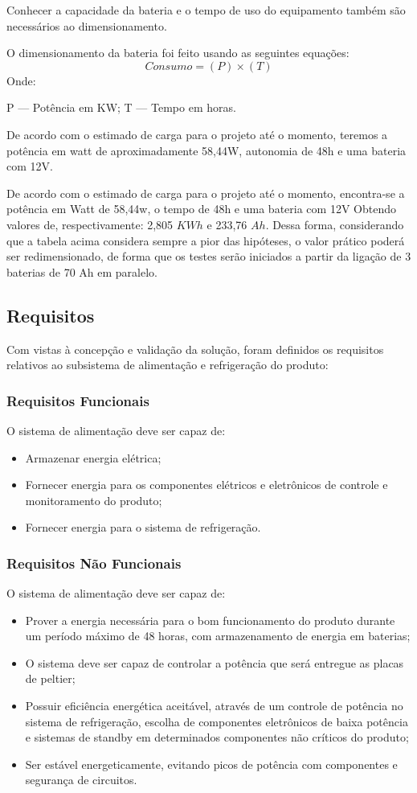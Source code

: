 Conhecer a capacidade da bateria e o tempo de uso do equipamento também são necessários ao dimensionamento.

O dimensionamento da bateria foi feito usando as seguintes equações:
\begin{equation}
Consumo = (P) \times (T)
\end{equation}
Onde: 

 P --- Potência em KW;
 T --- Tempo em horas.

De acordo com o estimado de carga para o projeto até o momento, teremos a potência em watt de aproximadamente 58,44W, autonomia de 48h e uma bateria com 12V. 

De acordo com o estimado de carga para o projeto até o momento, encontra-se a potência em Watt de 58,44w, o tempo de 48h e uma bateria com 12V  Obtendo valores de, respectivamente: 2,805 $KWh$ e 233,76 $Ah$. Dessa forma, considerando que a tabela acima considera sempre a pior das hipóteses, o valor prático poderá ser redimensionado, de forma que os testes serão iniciados a partir da ligação de 3 baterias de 70 Ah em paralelo.

\subsection{Requisitos}
Com vistas à concepção e validação da solução, foram definidos os requisitos relativos ao subsistema de alimentação e refrigeração do produto:

\subsubsection{Requisitos Funcionais}
O sistema de alimentação deve ser capaz de:
\begin{itemize}
\item Armazenar energia elétrica;
 \item Fornecer energia para os componentes elétricos e eletrônicos de controle e monitoramento do produto;
 \item Fornecer energia para o sistema de refrigeração.
 \end{itemize}
\subsubsection{Requisitos Não Funcionais}
O sistema de alimentação deve ser capaz de:
\begin{itemize}
\item Prover a energia necessária para o bom funcionamento do produto durante um período máximo de 48 horas, com armazenamento de energia em baterias;
\item O sistema deve ser capaz de controlar a potência que será entregue as placas de peltier;
 \item Possuir eficiência energética aceitável, através de um controle de potência no sistema de refrigeração, escolha de componentes eletrônicos de baixa potência e sistemas de standby em determinados componentes não críticos do produto;
 \item Ser estável energeticamente, evitando picos de potência com componentes e segurança de circuitos.
 \end{itemize}

